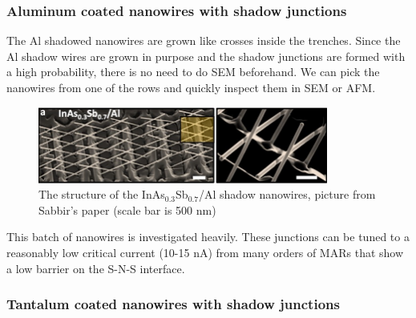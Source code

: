 \subsubsection{Aluminum coated nanowires with shadow junctions}
The Al shadowed nanowires are grown like crosses inside the trenches. Since the Al shadow wires are grown in purpose and the shadow junctions are formed with a high probability, there is no need to do SEM beforehand. We can pick the nanowires from one of the rows and quickly inspect them in SEM or AFM. 
\begin{figure}[h!]
    \centering
    \includegraphics[width=0.85\textwidth]{Pic/AlShadowWire.jpg}
    \caption{The structure of the InAs$_{0.3}$Sb$_{0.7}$/Al shadow nanowires, picture from Sabbir's paper\cite{RN38} (scale bar is 500 nm)}
    \label{fig:my_label}
\end{figure}

This batch of nanowires is investigated heavily. These junctions can be tuned to a reasonably low critical current (10-15 nA) from many orders of MARs that show a low barrier on the S-N-S interface\cite{RN38}.

\subsubsection{Tantalum coated nanowires with shadow junctions}


